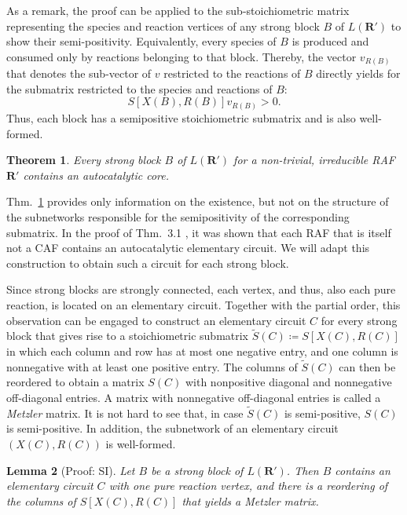 \documentclass[pdflatex]{sn-jnl}
\theoremstyle{thmstyleone}%
\newtheorem{theorem}{Theorem}%
\newtheorem{lemma}[theorem]{Lemma}%
\theoremstyle{examplesty}%
\theoremstyle{thmstylethree}%
\newcommand{\lord}{L}
\newcommand{\SM}{S}
\newcommand{\RAF}[0]{\mathbf{R}'}
\begin{document}
As a remark, the proof can be applied to the sub-stoichiometric matrix
representing the species and reaction vertices of any strong block $B$ of
$\lord(\RAF)$ to show their semi-positivity. Equivalently, every species of
$B$ is produced and consumed only by reactions belonging to that
block. Thereby, the vector $v_{R(B)}$ that denotes the sub-vector of $v$
restricted to the reactions of $B$ directly yields for the submatrix
restricted to the species and reactions of $B$:
\begin{equation}
  \SM[X(B), R(B)]v_{R(B)}>0.
\end{equation}
Thus, each block has a semipositive stoichiometric submatrix and is also
well-formed.
%
\vspace{6pt}
\begin{theorem}\label{Thm:StrBlockCore}
  Every strong block $B$ of $\lord(\RAF)$ for a non-trivial, irreducible
  RAF $\RAF$ contains an autocatalytic core.
\end{theorem}
\vspace{6pt}

Thm.~\ref{Thm:StrBlockCore} provides only information on the existence, but
not on the structure of the subnetworks responsible for the semipositivity
of the corresponding submatrix. In the proof of Thm.~3.1
\cite{golnik_bridging_2026}, it was shown that each RAF that is itself not
a CAF contains an autocatalytic elementary circuit. We will adapt this
construction to obtain such a circuit for each strong block.

Since strong blocks are strongly connected, each vertex, and thus, also
each pure reaction, is located on an elementary circuit. Together with the
partial order, this observation can be engaged to construct an elementary
circuit $C$ for every strong block that gives rise to a stoichiometric
submatrix $\tilde{\SM}(C)\coloneqq \SM[X(C), R(C)]$ in which each column
and row has at most one negative entry, and one column is nonnegative with
at least one positive entry. The columns of $\tilde{\SM}(C)$ can then be
reordered to obtain a matrix $\SM(C)$ with nonpositive diagonal and
nonnegative off-diagonal entries.  A matrix with nonnegative off-diagonal
entries is called a \emph{Metzler} matrix. It is not hard to see that, in
case $\tilde{\SM}(C)$ is semi-positive, $\SM(C)$ is semi-positive. In
addition, the subnetwork of an elementary circuit $(X(C),R(C))$ is
well-formed.

\vspace{6pt}
\begin{lemma}[Proof: SI]\label{lem:MetzCircuit}
  Let $B$ be a strong block of $\lord(\RAF)$. Then $B$ contains an
  elementary circuit $C$ with one pure reaction vertex, and there is a
  reordering of the columns of $ \SM[X(C), R(C)]$ that yields a Metzler
  matrix.
\end{lemma}
\vspace{6pt}
\end{document}
